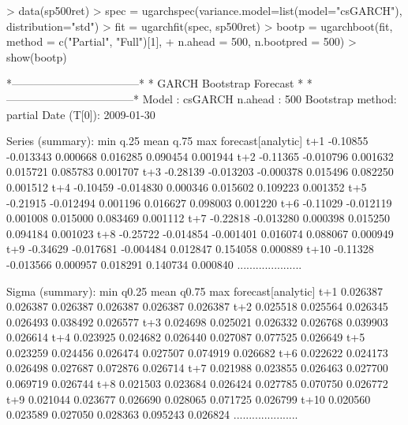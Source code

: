 \begin{Schunk}
\begin{Sinput}
> data(sp500ret)
> spec = ugarchspec(variance.model=list(model="csGARCH"), distribution="std")
> fit = ugarchfit(spec, sp500ret)
> bootp = ugarchboot(fit, method = c("Partial", "Full")[1],
+ n.ahead = 500, n.bootpred = 500)
> show(bootp)
\end{Sinput}
\begin{Soutput}
*-----------------------------------*
*     GARCH Bootstrap Forecast      *
*-----------------------------------*
Model : csGARCH
n.ahead : 500
Bootstrap method:  partial
Date (T[0]): 2009-01-30

Series (summary):
          min      q.25      mean     q.75      max forecast[analytic]
t+1  -0.10855 -0.013343  0.000668 0.016285 0.090454           0.001944
t+2  -0.11365 -0.010796  0.001632 0.015721 0.085783           0.001707
t+3  -0.28139 -0.013203 -0.000378 0.015496 0.082250           0.001512
t+4  -0.10459 -0.014830  0.000346 0.015602 0.109223           0.001352
t+5  -0.21915 -0.012494  0.001196 0.016627 0.098003           0.001220
t+6  -0.11029 -0.012119  0.001008 0.015000 0.083469           0.001112
t+7  -0.22818 -0.013280  0.000398 0.015250 0.094184           0.001023
t+8  -0.25722 -0.014854 -0.001401 0.016074 0.088067           0.000949
t+9  -0.34629 -0.017681 -0.004484 0.012847 0.154058           0.000889
t+10 -0.11328 -0.013566  0.000957 0.018291 0.140734           0.000840
.....................

Sigma (summary):
          min    q0.25     mean    q0.75      max forecast[analytic]
t+1  0.026387 0.026387 0.026387 0.026387 0.026387           0.026387
t+2  0.025518 0.025564 0.026345 0.026493 0.038492           0.026577
t+3  0.024698 0.025021 0.026332 0.026768 0.039903           0.026614
t+4  0.023925 0.024682 0.026440 0.027087 0.077525           0.026649
t+5  0.023259 0.024456 0.026474 0.027507 0.074919           0.026682
t+6  0.022622 0.024173 0.026498 0.027687 0.072876           0.026714
t+7  0.021988 0.023855 0.026463 0.027700 0.069719           0.026744
t+8  0.021503 0.023684 0.026424 0.027785 0.070750           0.026772
t+9  0.021044 0.023677 0.026690 0.028065 0.071725           0.026799
t+10 0.020560 0.023589 0.027050 0.028363 0.095243           0.026824
.....................

\end{Soutput}
\end{Schunk}
